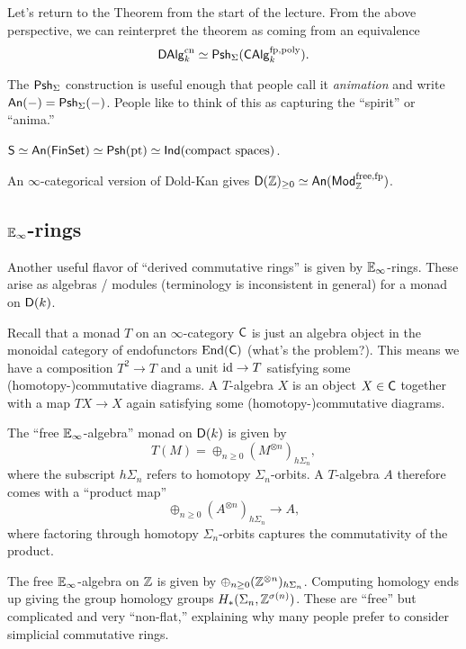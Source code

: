 \documentclass{amsart}
\begin{document}
Let's return to the Theorem from the start of the lecture.
From the above perspective, we can reinterpret the theorem as coming from an equivalence
\[
	\mathsf{DAlg}_k^{\mathrm{cn}} \simeq \mathsf{Psh}_\Sigma(\mathsf{CAlg}_k^{\mathrm{fp,poly}}).
\]

The $\mathsf{Psh}_\Sigma$ construction is useful enough that people call it \emph{animation} and write $\mathsf{An}(-) = \mathsf{Psh}_\Sigma(-)$.
People like to think of this as capturing the ``spirit'' or ``anima.''

\begin{ex}
	$\mathsf{S} \simeq \mathsf{An}(\mathsf{FinSet}) \simeq \mathsf{Psh}(\operatorname{pt}) \simeq \mathsf{Ind}(\textrm{compact spaces})$.
\end{ex}

\begin{ex}
	An $\infty$-categorical version of Dold-Kan gives $\mathsf{D}(\mathbb{Z})_{\geq 0} \simeq \mathsf{An}(\mathsf{Mod}_{\mathbb{Z}}^{\textrm{free,fp}})$.
\end{ex}

\subsection{$\mathbb{E}_\infty$-rings}

Another useful flavor of ``derived commutative rings'' is given by $\mathbb{E}_\infty$-rings.
These arise as algebras / modules (terminology is inconsistent in general) for a monad on $\mathsf{D}(k)$.

Recall that a monad $T$ on an $\infty$-category $\mathsf{C}$ is just an algebra object in the monoidal category of endofunctors $\operatorname{End}(\mathsf{C})$ (what's the problem?).
This means we have a composition $T^2 \to T$ and a unit $\operatorname{id} \to T$ satisfying some (homotopy-)commutative diagrams.
A $T$-algebra $X$ is an object $X \in \mathsf{C}$ together with a map $TX \to X$ again satisfying some (homotopy-)commutative diagrams.

The ``free $\mathbb{E}_\infty$-algebra'' monad on $\mathsf{D}(k)$ is given by
\[
	T(M) = \oplus_{n \geq 0} (M^{\otimes n})_{h \Sigma_n},
\]
where the subscript $h \Sigma_n$ refers to homotopy $\Sigma_n$-orbits.
A $T$-algebra $A$ therefore comes with a ``product map''
\[
	\oplus_{n \geq 0} (A^{\otimes n})_{h \Sigma_n} \to A,
\]
where factoring through homotopy $\Sigma_n$-orbits captures the commutativity of the product.

\begin{ex}
	The free $\mathbb{E}_\infty$-algebra on $\mathbb{Z}$ is given by $\oplus_{n \geq 0} (\mathbb{Z}^{\otimes n})_{h \Sigma_n}$.
	Computing homology ends up giving the group homology groups $H_*(\Sigma_n, \mathbb{Z}^{\sigma(n)})$.
	These are ``free'' but complicated and very ``non-flat,'' explaining why many people prefer to consider simplicial commutative rings.
\end{ex}
\end{document}
